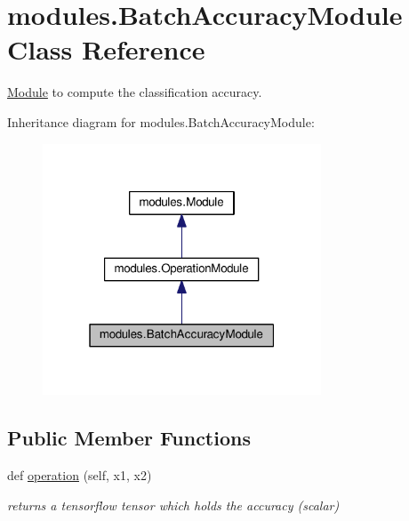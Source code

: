 \hypertarget{classmodules_1_1_batch_accuracy_module}{}\section{modules.\+Batch\+Accuracy\+Module Class Reference}
\label{classmodules_1_1_batch_accuracy_module}


\hyperlink{classmodules_1_1_module}{Module} to compute the classification accuracy.  




Inheritance diagram for modules.\+Batch\+Accuracy\+Module\+:\nopagebreak
\begin{figure}[H]
\begin{center}
\leavevmode
\includegraphics[width=235pt]{classmodules_1_1_batch_accuracy_module__inherit__graph}
\end{center}
\end{figure}
\subsection*{Public Member Functions}
\begin{DoxyCompactItemize}
\item 
\mbox{\label{classmodules_1_1_batch_accuracy_module_abb6f5b1c6d8e93ddec73bd8a69453da8}} 
def \hyperlink{classmodules_1_1_batch_accuracy_module_abb6f5b1c6d8e93ddec73bd8a69453da8}{operation} (self, x1, x2)
\begin{DoxyCompactList}\small\item\em returns a tensorflow tensor which holds the accuracy (scalar) \end{DoxyCompactList}\end{DoxyCompactItemize}

